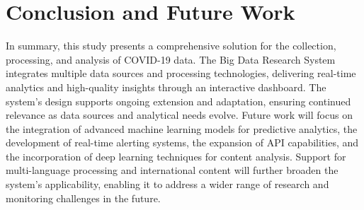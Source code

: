 \documentclass[a4paper]{article}
\theoremstyle{plain}
\theoremstyle{definition}
\begin{document}
\section{Conclusion and Future Work}

In summary, this study presents a comprehensive solution for the collection, processing, and analysis of COVID-19 data. The Big Data Research System integrates multiple data sources and processing technologies, delivering real-time analytics and high-quality insights through an interactive dashboard. The system's design supports ongoing extension and adaptation, ensuring continued relevance as data sources and analytical needs evolve. Future work will focus on the integration of advanced machine learning models for predictive analytics, the development of real-time alerting systems, the expansion of API capabilities, and the incorporation of deep learning techniques for content analysis. Support for multi-language processing and international content will further broaden the system's applicability, enabling it to address a wider range of research and monitoring challenges in the future.

%
\end{document}
